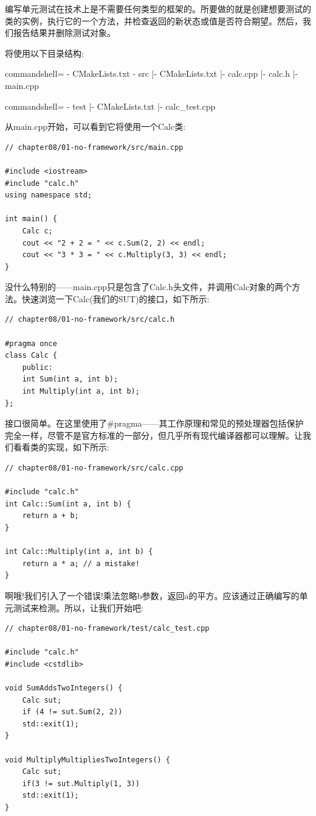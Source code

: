 
编写单元测试在技术上是不需要任何类型的框架的。所要做的就是创建想要测试的类的实例，执行它的一个方法，并检查返回的新状态或值是否符合期望。然后，我们报告结果并删除测试对象。

将使用以下目录结构:

\begin{tcblisting}{commandshell={}}
- CMakeLists.txt
- src
     |- CMakeLists.txt
     |- calc.cpp
     |- calc.h
     |- main.cpp
\end{tcblisting}
\begin{tcblisting}{commandshell={}}
- test
     |- CMakeLists.txt
     |- calc_test.cpp
\end{tcblisting}

从main.cpp开始，可以看到它将使用一个Calc类:

\begin{lstlisting}[style=styleCXX]
// chapter08/01-no-framework/src/main.cpp

#include <iostream>
#include "calc.h"
using namespace std;

int main() {
	Calc c;
	cout << "2 + 2 = " << c.Sum(2, 2) << endl;
	cout << "3 * 3 = " << c.Multiply(3, 3) << endl;
}
\end{lstlisting} 

没什么特别的——main.cpp只是包含了Calc.h头文件，并调用Calc对象的两个方法。快速浏览一下Calc(我们的SUT)的接口，如下所示:

\begin{lstlisting}[style=styleCXX]
// chapter08/01-no-framework/src/calc.h

#pragma once
class Calc {
	public:
	int Sum(int a, int b);
	int Multiply(int a, int b);
};
\end{lstlisting} 

接口很简单。在这里使用了\#pragma——其工作原理和常见的预处理器包括保护完全一样，尽管不是官方标准的一部分，但几乎所有现代编译器都可以理解。让我们看看类的实现，如下所示:

\begin{lstlisting}[style=styleCXX]
// chapter08/01-no-framework/src/calc.cpp

#include "calc.h"
int Calc::Sum(int a, int b) {
	return a + b;
}

int Calc::Multiply(int a, int b) {
	return a * a; // a mistake!
}
\end{lstlisting} 

啊哦!我们引入了一个错误!乘法忽略b参数，返回a的平方。应该通过正确编写的单元测试来检测。所以，让我们开始吧:

\begin{lstlisting}[style=styleCXX]
// chapter08/01-no-framework/test/calc_test.cpp

#include "calc.h"
#include <cstdlib>

void SumAddsTwoIntegers() {
	Calc sut;
	if (4 != sut.Sum(2, 2))
	std::exit(1);
}

void MultiplyMultipliesTwoIntegers() {
	Calc sut;
	if(3 != sut.Multiply(1, 3))
	std::exit(1);
}
\end{lstlisting} 

